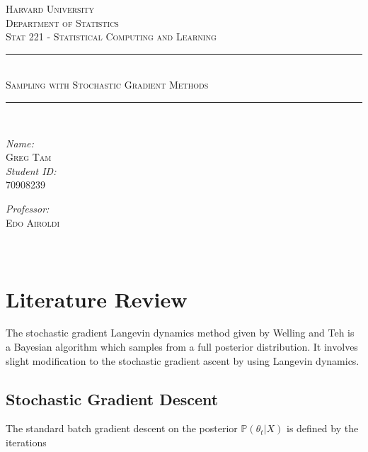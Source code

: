 \documentclass[letterpaper,12pt]{amsart}
\newcommand{\p}[1]{\mathbb{P}\!\left(#1\right)}
\begin{document}

\begin{titlepage}
\begin{center}
\textsc{\huge Harvard University}\\
\textsc{Department of Statistics}\\[5em]
\textsc{Stat 221 - Statistical Computing and Learning}\\[2em]


\rule{\linewidth}{0.5mm} \\ [1.5em]
\textsc{\Large Sampling with Stochastic Gradient Methods}\\[1em]
\rule{\linewidth}{0.5mm} \\[10em]

\begin{minipage}{0.4\textwidth}
\begin{flushleft} \large
\emph{Name:}\\
\textsc{Greg Tam}\\
\emph{Student ID:}\\
70908239
\end{flushleft}
\end{minipage}
\begin{minipage}{0.4\textwidth}
\begin{flushright} \large
\emph{Professor:} \\
\textsc{Edo Airoldi}\\
\qquad\\
\qquad\\
\end{flushright}
\end{minipage}

\end{center}
\end{titlepage}




\section{Literature Review}
The stochastic gradient Langevin dynamics method given by Welling and Teh is a Bayesian algorithm which samples from a full posterior distribution. It involves slight modification to the stochastic gradient ascent by using Langevin dynamics. 

\subsection{Stochastic Gradient Descent}
The standard batch gradient descent on the posterior $\p{\theta_t | X}$ is defined by the iterations
\end{document}
